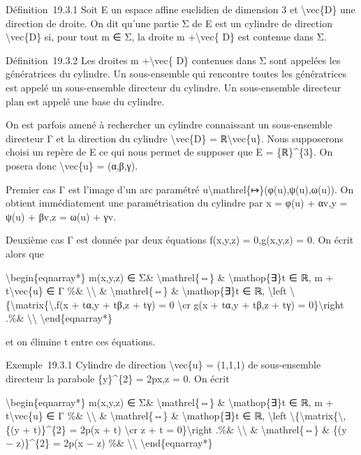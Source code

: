 \documentclass[]{article}
\begin{document}
Définition~19.3.1 Soit E un espace affine euclidien de dimension 3 et
\textbackslash{}vec\{D\} une direction de droite. On dit qu'une partie Σ
de E est un cylindre de direction \textbackslash{}vec\{D\} si, pour tout
m ∈ Σ, la droite m +\textbackslash{}vec\{ D\} est contenue dans Σ.

Définition~19.3.2 Les droites m +\textbackslash{}vec\{ D\} contenues
dans Σ sont appelées les génératrices du cylindre. Un sous-ensemble qui
rencontre toutes les génératrices est appelé un sous-ensemble directeur
du cylindre. Un sous-ensemble directeur plan est appelé une base du
cylindre.

On est parfois amené à rechercher un cylindre connaissant un
sous-ensemble directeur Γ et la direction du cylindre
\textbackslash{}vec\{D\} = ℝ\textbackslash{}vec\{u\}. Nous supposerons
choisi un repère de E ce qui nous permet de supposer que E =
\{ℝ\}\^{}\{3\}. On posera donc \textbackslash{}vec\{u\} = (α,β,γ).

Premier cas Γ est l'image d'un arc paramétré
u\textbackslash{}mathrel\{↦\}(φ(u),ψ(u),ω(u)). On obtient immédiatement
une paramétrisation du cylindre par x = φ(u) + αv,y = ψ(u) + βv,z = ω(u)
+ γv.

Deuxième cas Γ est donnée par deux équations f(x,y,z) = 0,g(x,y,z) = 0.
On écrit alors que

\textbackslash{}begin\{eqnarray*\} m(x,y,z) ∈ Σ\&
\textbackslash{}mathrel\{⇔\} \& \textbackslash{}mathop\{∃\}t ∈ ℝ, m +
t\textbackslash{}vec\{u\} ∈ Γ \%\& \textbackslash{}\textbackslash{} \&
\textbackslash{}mathrel\{⇔\} \& \textbackslash{}mathop\{∃\}t ∈ ℝ,
\textbackslash{}left
\textbackslash{}\{\textbackslash{}matrix\{\textbackslash{},f(x + tα,y +
tβ,z + tγ) = 0 \textbackslash{}cr g(x + tα,y + tβ,z + tγ) =
0\}\textbackslash{}right .\%\& \textbackslash{}\textbackslash{}
\textbackslash{}end\{eqnarray*\}

et on élimine t entre ces équations.

Exemple~19.3.1 Cylindre de direction \textbackslash{}vec\{u\} = (1,1,1)
de sous-ensemble directeur la parabole \{y\}\^{}\{2\} = 2px,z = 0. On
écrit

\textbackslash{}begin\{eqnarray*\} m(x,y,z) ∈ Σ\&
\textbackslash{}mathrel\{⇔\} \& \textbackslash{}mathop\{∃\}t ∈ ℝ, m +
t\textbackslash{}vec\{u\} ∈ Γ \%\& \textbackslash{}\textbackslash{} \&
\textbackslash{}mathrel\{⇔\} \& \textbackslash{}mathop\{∃\}t ∈ ℝ,
\textbackslash{}left
\textbackslash{}\{\textbackslash{}matrix\{\textbackslash{},\{(y +
t)\}\^{}\{2\} = 2p(x + t) \textbackslash{}cr z + t =
0\}\textbackslash{}right .\%\& \textbackslash{}\textbackslash{} \&
\textbackslash{}mathrel\{⇔\} \& \{(y − z)\}\^{}\{2\} = 2p(x − z) \%\&
\textbackslash{}\textbackslash{} \textbackslash{}end\{eqnarray*\}
\end{document}
